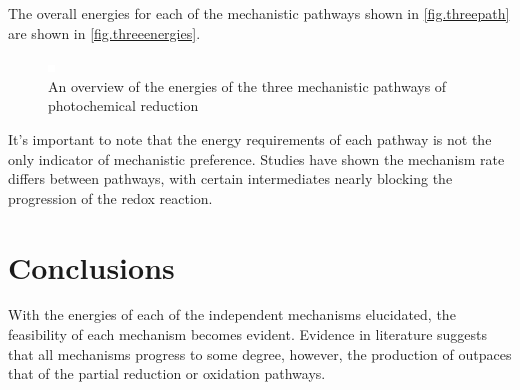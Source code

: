 The overall energies for each of the mechanistic pathways shown in \autoref{fig.threepath} are shown in \autoref{fig.threeenergies}. 

\begin{figure}[!htbp]
 \begin{center}
  \includegraphics[clip=true]{images/insertgraphic.eps}
 \end{center}
\caption[Reaction energies for three mechanistic pathways]{An overview of the energies of the three mechanistic pathways of photochemical  reduction}
\label{fig.threeenergies}
\end{figure} 

It's important to note that the energy requirements of each pathway is not the only indicator of mechanistic preference. Studies have shown the mechanism rate differs between pathways, with certain intermediates nearly blocking the progression of the redox reaction.



\section{Conclusions} 

With the energies of each of the independent mechanisms elucidated, the feasibility of each mechanism becomes evident. Evidence in literature suggests that all mechanisms progress to some degree, however, the production of  outpaces that of the partial reduction or oxidation pathways. 

